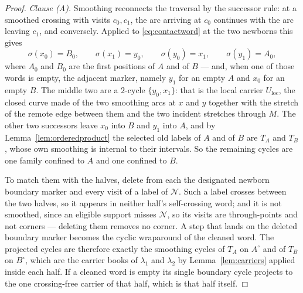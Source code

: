 \begin{proof}
\emph{Clause (A).}
Smoothing reconnects the traversal by the successor rule: at a smoothed
crossing with visits $c_0,c_1$, the arc arriving at $c_0$ continues with the
arc leaving $c_1$, and conversely. Applied to \eqref{eq:contactword} at the two
newborns this gives
\[
   \sigma(x_0)=B_0,\qquad
   \sigma(x_1)=y_0,\qquad
   \sigma(y_0)=x_1,\qquad
   \sigma(y_1)=A_0,
\]
where $A_0$ and $B_0$ are the first positions of $A$ and of $B$ --- and, when
one of those words is empty, the adjacent marker, namely $y_1$ for an empty
$A$ and $x_0$ for an empty $B$. The middle two are a $2$-cycle
$\{y_0,x_1\}$: that is the local carrier $U_{\mathrm{loc}}$, the closed curve made of the
two smoothing arcs at $x$ and $y$ together with the stretch of the remote edge
between them and the two incident stretches through $M$. The other two
successors leave $x_0$ into $B$ and $y_1$ into $A$, and by
Lemma~\ref{lem:orderedproduct} the selected old labels of $A$ and of $B$ are
$T_A$ and $T_B$, whose own smoothing is internal to their intervals. So the
remaining cycles are one family confined to $A$ and one confined to $B$.

To match them with the halves, delete from each the designated newborn boundary
marker and every visit of a label of $\mathcal N$. Such a label crosses between
the two halves, so it appears in neither half's self-crossing word; and it is
not smoothed, since an eligible support misses $\mathcal N$, so its visits are
through-points and not corners --- deleting them removes no corner. A step that
lands on the deleted boundary marker becomes the cyclic wraparound of the
cleaned word. The projected cycles are therefore exactly the smoothing cycles
of $T_A$ on $A^{\circ}$ and of $T_B$ on $B^{\circ}$, which are the carrier
books of $\lambda_1$ and $\lambda_2$ by Lemma~\ref{lem:carriers} applied inside
each half. If a cleaned word is empty its single boundary cycle projects to the
one crossing-free carrier of that half, which is that half itself.



\end{proof}

